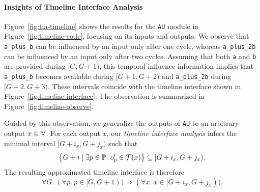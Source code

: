 \paragraph{Insights of Timeline Interface Analysis}

Figure~\ref{fig:tia-timeline} shows the \tia results for the \texttt{AU} module in Figure~\ref{fig:timeline-code}, focusing on its inputs and outputs.
We observe that \texttt{a\_plus\_b} can be influenced by an input only after one cycle, whereas \texttt{a\_plus\_2b} can be influenced by an input only after two cycles.
Assuming that both \texttt{a} and \texttt{b} are provided during $[G,G+1)$, this temporal influence information implies that \texttt{a\_plus\_b} becomes available during $[G+1,G+2)$ and \texttt{a\_plus\_2b} during $[G+2,G+3)$.
These intervals coincide with the timeline interface shown in Figure~\ref{fig:timeline-interface}.
The observation is summarized in Figure~\ref{fig:timeline-observe}.

Guided by this observation, we generalize the outputs of \texttt{AU} to an arbitrary output $x\in\mathbb{V}$.
For each output $x$, our \emph{timeline interface analysis} infers the minimal interval $[G+i_x,G+j_x)$ such that
\[
\left\{G + i \mid \exists p \in \mathbb{P}.\ o_p^i \in \mathcal{T}(x)\right\} \subseteq [G+i_x, G+j_x).
\]
The resulting approximated timeline interface is therefore
\[
\forall G.\ (\forall p.\ p \in [G, G+1)) \Rightarrow (\forall x.\ x \in [G + i_x, G + j_x)).
\]


